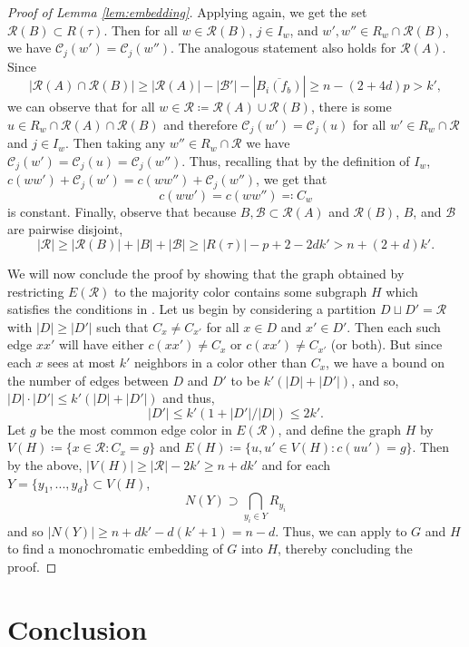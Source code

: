 \documentclass{article}
\newcommand{\cB}{\mathcal{B} }
\newcommand{\cC}{\mathcal{C} }
\newcommand{\cR}{\mathcal{R} }
\theoremstyle{definition}
\begin{document}
\begin{proof}[Proof of Lemma \ref{lem:embedding}]
Applying  again, we get the set $\cR(B)\subset R(\tau)$. Then for all $w\in \cR(B)$, $j\in I_w$, and $w',w''\in R_w\cap \cR(B)$, we have $\cC_j(w')=\cC_j(w'')$. The analogous statement also holds for $\cR(A)$. Since $$|\cR(A)\cap \cR(B)|\geq |\cR(A)|-|\cB'|-|\overline{B_{i}(f_b)}|\geq n- (2+4d)p>k',$$ we can observe that for all $w\in \cR \coloneqq \cR(A)\cup \cR(B)$, there is some $u\in R_w\cap \cR(A)\cap \cR(B)$ and therefore $\cC_j(w')=\cC_j(u)$ for all $w'\in R_w\cap \cR$ and $j\in I_w$. Then taking any $w''\in R_w\cap \cR$ we have $\cC_j(w')=\cC_j(u)=\cC_j(w'')$. Thus, recalling that by the definition of $I_w$, $c(ww')+\cC_j(w')=c(ww'')+\cC_j(w'')$, we get that $$c(ww')=c(ww'')\eqqcolon C_w$$ is constant. Finally, observe that because $B,\cB\subset \cR(A) $ and $\cR(B)$, $B$, and $\cB$ are pairwise disjoint, $$|\cR| \geq |\cR(B)| + |B|+|\cB| \geq |R(\tau)|-p+2-2dk' >  n+(2+d)k'.$$

We will now conclude the proof by showing that the graph obtained by restricting $E(\cR)$ to the majority color contains some subgraph $H$ which satisfies the conditions in .
Let us begin by considering a partition $D\sqcup D'= \cR$ with $|D|\geq |D'|$ such that $C_x\neq C_{x'}$ for all $x\in D$ and $x'\in D'$. Then each such edge $xx'$ will have either $c(xx')\neq C_x$ or $c(xx')\neq C_{x'}$ (or both). But since each $x$ sees at most $k'$ neighbors in a color other than $C_x$, we have a bound on the number of edges between $D$ and $D'$ to be $k'(|D|+|D'|)$, and so, $|D|\cdot|D'|\leq k'(|D|+|D'|)$ and thus, $$|D'|\leq k'(1 + |D'|/|D|)\leq 2k'.$$ 
Let $g$ be the most common edge color in $E(\cR)$, and define the graph $H$ by $V(H)\coloneqq\{x\in \cR:C_x=g\}$ and $E(H)\coloneqq \{u,u'\in V(H): c(uu')=g\}$. Then by the above,  $|V(H)|\geq |\cR|-2k'\geq n +dk'$ and for each $Y=\{y_1,...,y_d\}\subset V(H)$, $$N(Y)\supset \bigcap_{y_i\in Y}  R_{y_i}$$ and so $|N(Y)|\geq n+dk'-d(k'+1)=n-d$. Thus, we can apply  to $G$ and $H$ to find a monochromatic embedding of $G$ into $H$, thereby concluding the proof.
\end{proof}

\section{Conclusion}
\end{document}
